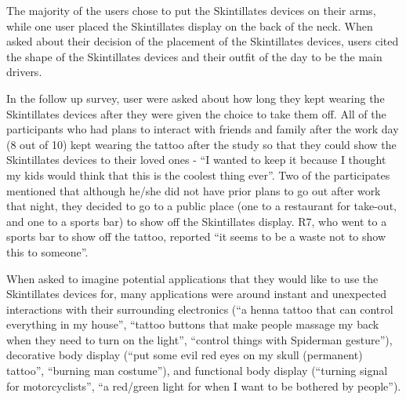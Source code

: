 \documentclass{sigchi}
\begin{document}
The majority of the users chose to put the Skintillates devices on their arms, while one user placed the Skintillates display on the back of the neck. When asked about their decision of the placement of the Skintillates devices, users cited the shape of the Skintillates devices and their outfit of the day to be the main drivers. 

In the follow up survey, user were asked about how long they kept wearing the Skintillates devices after they were given the choice to take them off. All of the participants  who had plans to interact with friends and family after the work day (8 out of 10) kept wearing the tattoo after the study so that they could show the Skintillates devices to their loved ones - ``I wanted to keep it because I thought my kids would think that this is the coolest thing ever''. Two of the participates mentioned that although he/she did not have prior plans to go out after work that night, they decided to go to a public place (one to a restaurant for take-out, and one to a sports bar) to show off the Skintillates display. R7, who went to a sports bar to show off the tattoo, reported ``it seems to be a waste not to show this to someone''. 

When asked to imagine potential applications that they would like to use the Skintillates devices for, many applications were around instant and unexpected interactions with their surrounding electronics (``a henna tattoo that can control everything in my house'', ``tattoo buttons that make people massage my back when they need to turn on the light'', ``control things with Spiderman gesture''), decorative body display (``put some evil red eyes on my skull (permanent) tattoo'', ``burning man costume''), and functional body display (``turning signal for motorcyclists'', ``a red/green light for when I want to be bothered by people''). 
\end{document}
